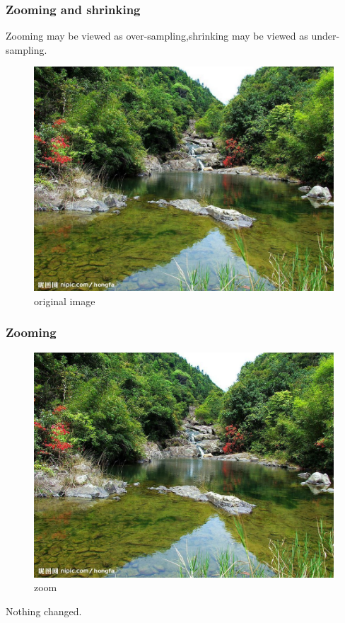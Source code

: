 \documentclass[notheorems, serif, table, compress]{beamer}  %
\begin{document}
 \begin{frame}

\frametitle{Zooming and shrinking} %
    
Zooming may be viewed as over-sampling,shrinking may be viewed as under-sampling.%


 \begin{figure}
 \centering
 \caption{original image}
 \includegraphics[width=0.7\linewidth]{zoomandshrinkor.png} 
 \end{figure}
\end{frame}

\begin{frame}
\frametitle{Zooming}
 \begin{figure}
 \caption{zoom}
 \includegraphics[width=0.7\linewidth]{fangda.png}
  \end{figure}

Nothing changed. 
\end{frame}
\end{document}
